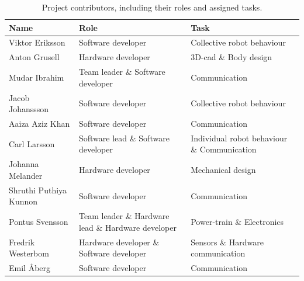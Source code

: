 \begin{table}[H]
    \centering
    \caption{Project contributors, including their roles and assigned tasks.}
    \label{tab:contributors_roles}
    \begin{tabularx}{\columnwidth}{|X|X|X|} \hline
         \textbf{Name}          & \textbf{Role}                                         & \textbf{Task}                                 \\ \hline
         Viktor Eriksson        & Software developer                                    & Collective robot behaviour                    \\ \hline
         Anton Grusell          & Hardware developer                                    & 3D-\acs{cad} \& Body design                   \\ \hline
         Mudar Ibrahim          & Team leader \& Software developer                     & Communication                                 \\ \hline
         Jacob Johanssson       & Software developer                                    & Collective robot behaviour                    \\ \hline
         Aaiza Aziz Khan        & Software developer                                    & Communication                                 \\ \hline
         Carl Larsson           & Software lead \& Software developer                   & Individual robot behaviour \& Communication   \\ \hline
         Johanna Melander       & Hardware developer                                    & Mechanical design                             \\ \hline
         Shruthi Puthiya Kunnon & Software developer                                    & Communication                                 \\ \hline
         Pontus Svensson        & Team leader \& Hardware lead \& Hardware developer    & Power-train \& Electronics                    \\ \hline
         Fredrik Westerbom      & Hardware developer \& Software developer              & Sensors \& Hardware communication             \\ \hline
         Emil Åberg             & Software developer                                    & Communication   \\ \hline
    \end{tabularx}
\end{table}


